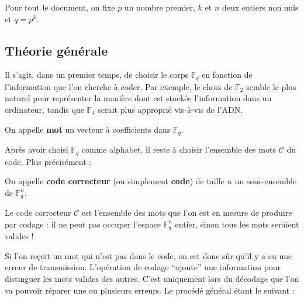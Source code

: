 




  \nocite{[FFN]}
  \nocite{[PEY]}
  \nocite{[BMP]}

  Pour tout le document, on fixe $p$ un nombre premier, $k$ et $n$ deux entiers non nuls et $q = p^k$.

  \subsection{Théorie générale}

  Il s'agit, dans un premier temps, de choisir le corps $\mathbb{F}_q$ en fonction de l'information que l'on cherche à coder. Par exemple, le choix de $\mathbb{F}_2$ semble le plus naturel pour représenter la manière dont est stockée l'information dans un ordinateur, tandis que $\mathbb{F}_4$ serait plus approprié vis-à-vis de l'ADN.

  \begin{definition}
    On appelle \textbf{mot} un vecteur à coefficients dans $\mathbb{F}_q$.
  \end{definition}

  Après avoir choisi $\mathbb{F}_q$ comme alphabet, il reste à choisir l'ensemble des mots $\mathcal{C}$ du code. Plus précisément :

  \begin{definition}
    On appelle \textbf{code correcteur} (ou simplement \textbf{code}) de taille $n$ un sous-ensemble de $\mathbb{F}_q^n$.
  \end{definition}

  \begin{remark}
    Le code correcteur $\mathcal{C}$ est l'ensemble des mots que l'on est en mesure de produire par codage : il ne peut pas occuper l'espace $\mathbb{F}_q^n$ entier, sinon tous les mots seraient valides !
  \end{remark}

  Si l'on reçoit un mot qui n'est pas dans le code, on est donc sûr qu'il y a eu une erreur de transmission. L'opération de codage ``ajoute'' une information pour distinguer les mots valides des autres. C'est uniquement lors du décodage que l'on va pouvoir réparer une ou plusieurs erreurs. Le procédé général étant le suivant :

